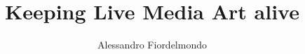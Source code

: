 \documentclass{unipd-thesis-modern} %
\title{Keeping Live Media Art alive}
\author{Alessandro Fiordelmondo}
\begin{document}
    \frontmatter

    \mainmatter

    
    \glsresetall  %


    

    
    
    
    
    

    

    
    \begin{appendices}
        
        
        
        
        
    \end{appendices}

    \backmatter
\end{document}
